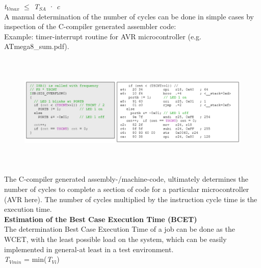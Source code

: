 \textit{t}${}_{Vmax}$ $\mathrm{\le}$ \textit{T${}_{SA}$ }· \textit{c}\\

A manual determination of the number of cycles can be done in simple cases by inspection of the C-compiler generated assembler code:\\

Example: timer-interrupt routine for AVR microcontroller (e.g. ATmega8\_sum.pdf).

	\begin{figure}[h]
    \centering
    \includegraphics[width=17cm, height=5.5cm]{Images/image78.png}
    \label{fig:Fig 24}
    \end{figure}
 
The C-compiler generated assembly-/machine-code, ultimately determines the number of cycles to complete a section of code for a particular microcontroller (AVR here). The number of cycles multiplied by the instruction cycle time is the execution time.\\

{\rot\bf Estimation of the Best Case Execution Time (BCET)}\\

The determination Best Case Execution Time of a job can be done as the WCET, with the least possible load on the system, which can be easily implemented in general-at least in a test environment.\\

\textit{T${}_{Vmin}$} = min(\textit{T${}_{Vi}$})

